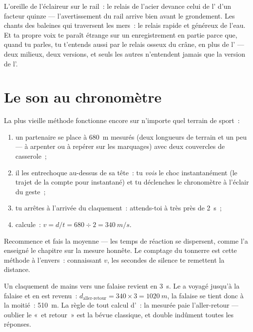 \begin{example}\label{ex:g7:sound-production:scenes}
L'oreille de l'éclaireur sur le rail~: le relais de l'acier devance
celui de l' d'un facteur quinze --- l'avertissement du rail arrive
bien avant le grondement. Les chants des baleines qui traversent les
mers~: le relais rapide et généreux de l'eau. Et ta propre voix te
paraît étrange sur un enregistrement en partie parce que, quand tu
parles, tu t'entends aussi par le relais osseux du crâne, en plus de
l' --- deux milieux, deux versions, et seuls les autres
n'entendent jamais que la version de l'.
\end{example}

\section{Le son au chronomètre}

\begin{method}\label{met:g7:sound-production:measure}
La plus vieille méthode fonctionne encore sur n'importe quel terrain
de sport~:
\begin{enumerate}
  \item un partenaire se place à \qty{680}{m} mesurés (deux
        longueurs de terrain et un peu --- à arpenter ou à repérer
        sur les marquages) avec deux couvercles de casserole~;
  \item il les entrechoque au-dessus de sa tête~: tu \emph{vois} le
        choc instantanément (le trajet de la  compte pour
        instantané) et tu déclenches le chronomètre à l'éclair du
        geste~;
  \item tu arrêtes à l'arrivée du claquement~: attends-toi à très
        près de \qty{2}{s}~;
  \item calcule~: $v = d/t = 680 \div 2 = \qty{340}{m/s}$.
\end{enumerate}
Recommence et fais la moyenne --- les temps de réaction se
dispersent, comme l'a enseigné le chapitre sur la mesure honnête. Le
comptage du tonnerre est cette méthode à l'envers~: connaissant $v$,
les secondes de silence te remettent la distance.
\end{method}

\begin{example}\label{ex:g7:sound-production:echo}
Un claquement de mains vers une falaise revient en \qty{3}{s}. Le 
a voyagé jusqu'à la falaise et en est revenu~:
$d_{\text{aller-retour}} = 340 \times 3 = \qty{1020}{m}$, la falaise
se tient donc à la moitié~: \qty{510}{m}. La règle de tout calcul
d'~: la  mesurée paie l'aller-retour --- oublier le «~et
retour~» est la bévue classique, et double indûment toutes les
réponses.
\end{example}


